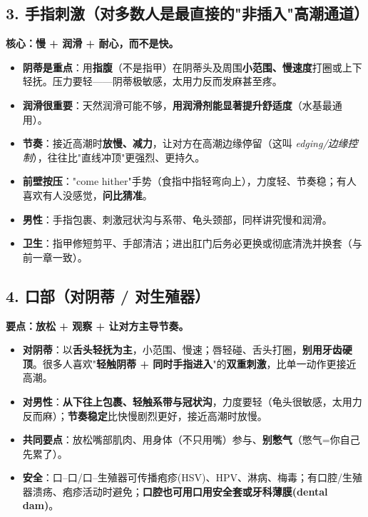 \subsection*{3. 手指刺激（对多数人是最直接的"非插入"高潮通道）}

\textbf{核心：慢 + 润滑 + 耐心，而不是快。}

\begin{itemize}[leftmargin=2em,itemsep=0.3em]
  \item \textbf{阴蒂是重点}：用\textbf{指腹}（不是指甲）在阴蒂头及周围\textbf{小范围、慢速度}打圈或上下轻抚。压力要轻——阴蒂极敏感，太用力反而发麻甚至疼。
  \item \textbf{润滑很重要}：天然润滑可能不够，\textbf{用润滑剂能显著提升舒适度}（水基最通用）。
  \item \textbf{节奏}：接近高潮时\textbf{放慢、减力}，让对方在高潮边缘停留（这叫 \emph{edging/边缘控制}），往往比"直线冲顶"更强烈、更持久。
  \item \textbf{前壁按压}："come hither"手势（食指中指轻弯向上），力度轻、节奏稳；有人喜欢有人没感觉，\textbf{问比猜准}。
  \item \textbf{男性}：手指包裹、刺激冠状沟与系带、龟头颈部，同样讲究慢和润滑。
  \item \textbf{卫生}：指甲修短剪平、手部清洁；进出肛门后务必更换或彻底清洗并换套（与前一章一致）。
\end{itemize}

\subsection*{4. 口部（对阴蒂 / 对生殖器）}

\textbf{要点：放松 + 观察 + 让对方主导节奏。}

\begin{itemize}[leftmargin=2em,itemsep=0.3em]
  \item \textbf{对阴蒂}：以\textbf{舌头轻抚为主}，小范围、慢速；唇轻碰、舌头打圈，\textbf{别用牙齿硬顶}。很多人喜欢"\textbf{轻触阴蒂 + 同时手指进入}"的\textbf{双重刺激}，比单一动作更接近高潮。
  \item \textbf{对男性}：\textbf{从下往上包裹、轻触系带与冠状沟}，力度要轻（龟头很敏感，太用力反而麻）；\textbf{节奏稳定}比快慢剧烈更好，接近高潮时放慢。
  \item \textbf{共同要点}：放松嘴部肌肉、用身体（不只用嘴）参与、\textbf{别憋气}（憋气=你自己先累了）。
  \item \textbf{安全}：口--口/口--生殖器可传播疱疹(HSV)、HPV、淋病、梅毒；有口腔/生殖器溃疡、疱疹活动时避免；\textbf{口腔也可用口用安全套或牙科薄膜(dental dam)}。
\end{itemize}

